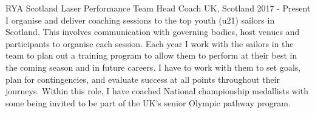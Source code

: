   \cventry
    {RYA Scotland} %
    {Laser Performance Team Head Coach} %
    {UK, Scotland} %
    {2017 - Present} %
    {
        I organise and deliver coaching sessions to the top youth (u21) 
        sailors in Scotland. This involves communication with governing bodies,
        host venues and participants to organise each session. Each year I 
        work with the sailors in the team to plan out a training program to 
        allow them to perform at their best in the coming season and in future 
        careers. I have to work with them to set goals, plan for contingencies,
        and evaluate success at all points throughout their journeys.
        Within this role, I have coached National championship 
        medallists with some being invited to be part 
        of the UK's senior Olympic pathway program.\newline
     }
